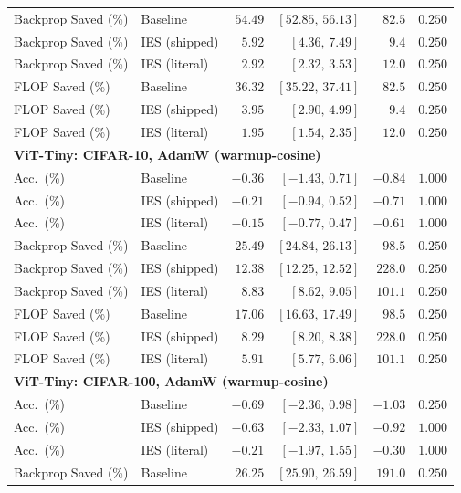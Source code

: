 \documentclass{article}
\newcommand{\win}[1]{\cellcolor{tgwin}#1}
\newcommand{\lose}[1]{\cellcolor{tglose}#1}
\theoremstyle{plain}
\theoremstyle{definition}
\theoremstyle{remark}
\begin{document}
\begin{longtable}{llrrrr}
Backprop Saved (\%) & Baseline & \win{$54.49$} & $[52.85,\,56.13]$ & $82.5$ & $0.250$ \\
Backprop Saved (\%) & IES (shipped) & \win{$5.92$} & $[4.36,\,7.49]$ & $9.4$ & $0.250$ \\
Backprop Saved (\%) & IES (literal) & \win{$2.92$} & $[2.32,\,3.53]$ & $12.0$ & $0.250$ \\
FLOP Saved (\%) & Baseline & \win{$36.32$} & $[35.22,\,37.41]$ & $82.5$ & $0.250$ \\
FLOP Saved (\%) & IES (shipped) & \win{$3.95$} & $[2.90,\,4.99]$ & $9.4$ & $0.250$ \\
FLOP Saved (\%) & IES (literal) & \win{$1.95$} & $[1.54,\,2.35]$ & $12.0$ & $0.250$ \\
\midrule
\multicolumn{6}{l}{\textbf{ViT-Tiny: CIFAR-10, AdamW (warmup-cosine)}} \\
\midrule
Acc.\ (\%) & Baseline & \lose{$-0.36$} & $[-1.43,\,0.71]$ & $-0.84$ & $1.000$ \\
Acc.\ (\%) & IES (shipped) & \lose{$-0.21$} & $[-0.94,\,0.52]$ & $-0.71$ & $1.000$ \\
Acc.\ (\%) & IES (literal) & \lose{$-0.15$} & $[-0.77,\,0.47]$ & $-0.61$ & $1.000$ \\
Backprop Saved (\%) & Baseline & \win{$25.49$} & $[24.84,\,26.13]$ & $98.5$ & $0.250$ \\
Backprop Saved (\%) & IES (shipped) & \win{$12.38$} & $[12.25,\,12.52]$ & $228.0$ & $0.250$ \\
Backprop Saved (\%) & IES (literal) & \win{$8.83$} & $[8.62,\,9.05]$ & $101.1$ & $0.250$ \\
FLOP Saved (\%) & Baseline & \win{$17.06$} & $[16.63,\,17.49]$ & $98.5$ & $0.250$ \\
FLOP Saved (\%) & IES (shipped) & \win{$8.29$} & $[8.20,\,8.38]$ & $228.0$ & $0.250$ \\
FLOP Saved (\%) & IES (literal) & \win{$5.91$} & $[5.77,\,6.06]$ & $101.1$ & $0.250$ \\
\midrule
\multicolumn{6}{l}{\textbf{ViT-Tiny: CIFAR-100, AdamW (warmup-cosine)}} \\
\midrule
Acc.\ (\%) & Baseline & \lose{$-0.69$} & $[-2.36,\,0.98]$ & $-1.03$ & $0.250$ \\
Acc.\ (\%) & IES (shipped) & \lose{$-0.63$} & $[-2.33,\,1.07]$ & $-0.92$ & $1.000$ \\
Acc.\ (\%) & IES (literal) & \lose{$-0.21$} & $[-1.97,\,1.55]$ & $-0.30$ & $1.000$ \\
Backprop Saved (\%) & Baseline & \win{$26.25$} & $[25.90,\,26.59]$ & $191.0$ & $0.250$ \\

\end{longtable}
\end{document}
